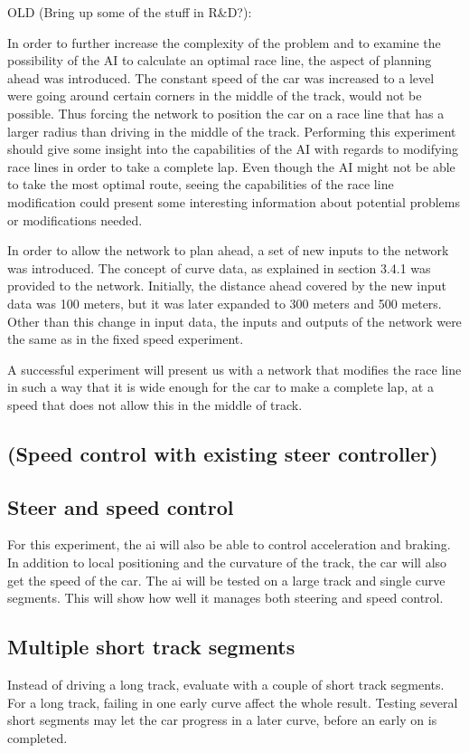 OLD (Bring up some of the stuff in R\&D?):

In order to further increase the complexity of the problem and to examine the possibility of the AI to calculate an optimal race line, the aspect of planning ahead was introduced. The constant speed of the car was increased to a level were going around certain corners in the middle of the track, would not be possible. Thus forcing the network to position the car on a race line that has a larger radius than driving in the middle of the track. Performing this experiment should give some insight into the capabilities of the AI with regards to modifying race lines in order to take a complete lap. Even though the AI might not be able to take the most optimal route, seeing the capabilities of the race line modification could present some interesting information about potential problems or modifications needed.

In order to allow the network to plan ahead, a set of new inputs to the network was introduced. The concept of curve data, as explained in section 3.4.1 was provided to the network. Initially, the distance ahead covered by the new input data was 100 meters, but it was later expanded to 300 meters and 500 meters. Other than this change in input data, the inputs and outputs of the network were the same as in the fixed speed experiment.

A successful experiment will present us with a network that modifies the race line in such a way that it is wide enough for the car to make a complete lap, at a speed that does not allow this in the middle of track. 


\subsection{(Speed control with existing steer controller)}

\subsection{Steer and speed control}
For this experiment, the ai will also be able to control acceleration and braking. In addition to local positioning and the curvature of the track, the car will also get the speed of the car.
The ai will be tested on a large track and single curve segments. This will show how well it manages both steering and speed control.

\subsection{Multiple short track segments}
Instead of driving a long track, evaluate with a couple of short track segments. For a long track, failing in one early curve affect the whole result. Testing several short segments may let the car progress in a later curve, before an early on is completed.

